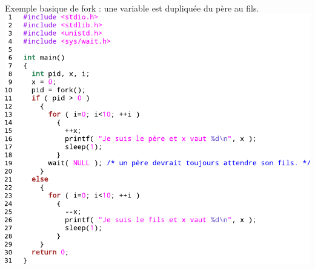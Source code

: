  \\ Exemple basique de fork : une variable est dupliquée du père au fils. \\
\includegraphics[width=\linewidth]{fig25.pdf}\newpage
{}
